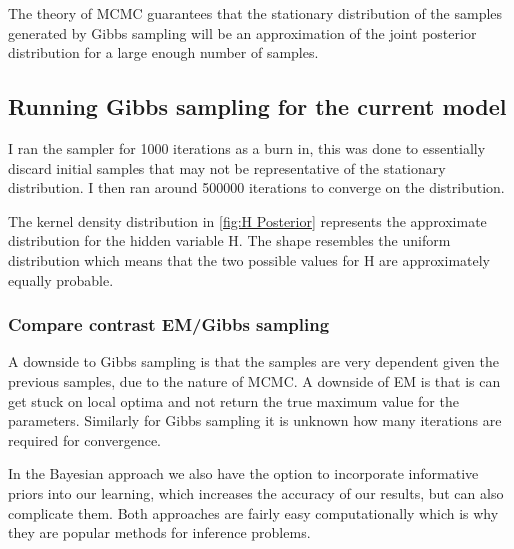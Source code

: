 \documentclass[12pt]{article} %
\begin{document}
The theory of MCMC guarantees that the stationary distribution of the samples generated by Gibbs sampling will be an approximation of the joint posterior distribution for a large enough number of samples.

\subsection{Running Gibbs sampling for the current model}
I ran the sampler for 1000 iterations as a burn in, this was done to essentially discard initial samples that may not be representative of the stationary distribution. I then ran around 500000 iterations to converge on the distribution.

The kernel density distribution in \cref{fig:H Posterior} represents the approximate distribution for the hidden variable H. The shape resembles the uniform distribution which means that the two possible values for H are approximately equally probable.

\subsubsection{Compare contrast EM/Gibbs sampling}
A downside to Gibbs sampling is that the samples are very dependent given the previous samples, due to the nature of MCMC. A downside of EM is that is can get stuck on local optima and not return the true maximum value for the parameters. Similarly for Gibbs sampling it is unknown how many iterations are required for convergence.

In the Bayesian approach we also have the option to incorporate informative priors into our learning, which increases the accuracy of our results, but can also complicate them. Both approaches are fairly easy computationally which is why they are popular methods for inference problems.
\end{document}

